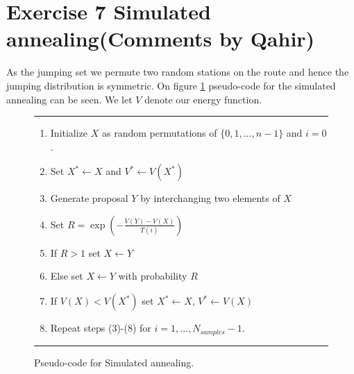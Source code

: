 \section*{Exercise 7 Simulated annealing(Comments by Qahir)}
As the jumping set we permute two random stations on the route and hence the jumping distribution is symmetric. On figure \ref{fig:ex7} pseudo-code for the simulated annealing can be seen. We let $V$ denote our energy function. 

\begin{figure}[H]
    \hrule
    \vspace*{0.2cm}
    \begin{enumerate}
    \item Initialize $X$ as random permutations of $\{0,1,...,n-1\}$ and $i=0$. 
    \item Set $X^* \leftarrow X$ and $V^* \leftarrow V(X^*)$
    \item Generate proposal $Y$ by interchanging two elements of $X$
    \item Set $R = \exp(-\frac{V(Y)-V(X)}{T(i)})$
    \item If $R > 1$ set $X \leftarrow Y$
    \item Else set $X \leftarrow Y$ with probability $R$
    \item If $V(X) < V(X^*)$ set $X^* \leftarrow X$, $V^* \leftarrow V(X)$
    \item Repeat steps (3)-(8) for $i = 1,...,N_{samples}-1$. 
    \end{enumerate}
    \vspace*{0.2cm}
    \hrule
    \vspace*{0.2cm}
    \caption{Pseudo-code for Simulated annealing.}
    \label{fig:ex7}
\end{figure}


